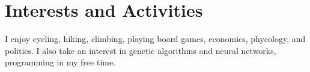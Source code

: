 \documentclass[a4paper,10pt]{article}
\begin{document}
\section{Interests and Activities}
I enjoy cycling, hiking, climbing, playing board games, economics, phycology, and politics. I also take an interest in genetic algorithms and neural networks, programming in my free time.\\
%
%
\bigskip
\bigskip
\bigskip


\end{document}
